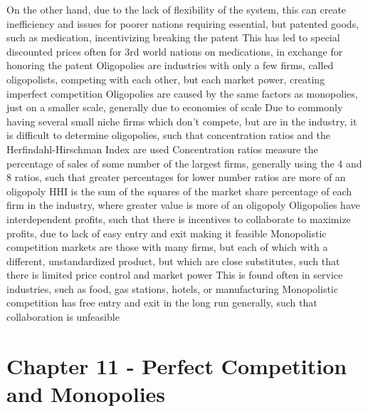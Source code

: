 \documentclass[11 pt, twoside]{article}
\newenvironment{outline*}
{
	\begin{outline}[enumerate]
	}
	{\end{outline}
}
\begin{document}
\begin{outline*}
\3 On the other hand, due to the lack of flexibility of the system, this can create inefficiency and issues for poorer nations requiring essential, but patented goods, such as medication, incentivizing breaking the patent
\4 This has led to special discounted prices often for 3rd world nations on medications, in exchange for honoring the patent
\1 Oligopolies are industries with only a few firms, called oligopolists, competing with each other, but each market power, creating imperfect competition
\2 Oligopolies are caused by the same factors as monopolies, just on a smaller scale, generally due to economies of scale
\2 Due to commonly having several small niche firms which don't compete, but are in the industry, it is difficult to determine oligopolies, such that concentration ratios and the Herfindahl-Hirschman Index are used
\3 Concentration ratios measure the percentage of sales of some number of the largest firms, generally using the 4 and 8 ratios, such that greater percentages for lower number ratios are more of an oligopoly
\3 HHI is the sum of the squares of the market share percentage of each firm in the industry, where greater value is more of an oligopoly
\2 Oligopolies have interdependent profits, such that there is incentives to collaborate to maximize profits, due to lack of easy entry and exit making it feasible
\1 Monopolistic competition markets are those with many firms, but each of which with a different, unstandardized product, but which are close substitutes, such that there is limited price control and market power
\2 This is found often in service industries, such as food, gas stations, hotels, or manufacturing
\2 Monopolistic competition has free entry and exit in the long run generally, such that collaboration is unfeasible
\end{outline*}
\section{Chapter 11 - Perfect Competition and Monopolies}
\end{document}
